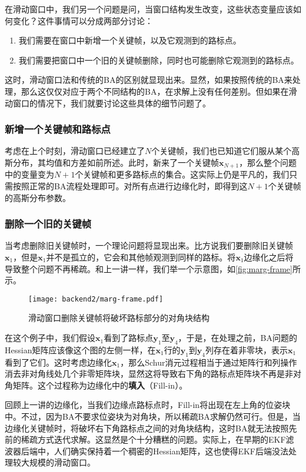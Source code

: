在滑动窗口中，我们另一个问题是问，当窗口结构发生改变，这些状态变量应该如何变化？这件事情可以分成两部分讨论：
\begin{enumerate}
\item 我们需要在窗口中新增一个关键帧，以及它观测到的路标点。
\item 我们需要把窗口中一个旧的关键帧删除，同时也可能删除它观测到的路标点。	
\end{enumerate}

这时，滑动窗口法和传统的BA的区别就显现出来。显然，如果按照传统的BA来处理，那么这仅仅对应于两个不同结构的BA，在求解上没有任何差别。但如果在滑动窗口的情况下，我们就要讨论这些具体的细节问题了。

\subsubsection{新增一个关键帧和路标点}
考虑在上个时刻，滑动窗口已经建立了$N$个关键帧，我们也已知道它们服从某个高斯分布，其均值和方差如前所述。此时，新来了一个关键帧$\bm{x}_{N+1}$，那么整个问题中的变量变为$N+1$个关键帧和更多路标点的集合。这实际上仍是平凡的，我们只需按照正常的BA流程处理即可。对所有点进行边缘化时，即得到这$N+1$个关键帧的高斯分布参数。

\subsubsection{删除一个旧的关键帧}
当考虑删除旧关键帧时，一个理论问题将显现出来。比方说我们要删除旧关键帧$\bm{x}_1$，但是$\bm{x}_1$并不是孤立的，它会和其他帧观测到同样的路标。将$\bm{x}_1$边缘化之后将导致整个问题不再稀疏。和上一讲一样，我们举一个示意图，如\autoref{fig:marg-frame}所示。

\begin{figure}[!ht]
    \centering
    \texttt{[image: backend2/marg-frame.pdf]}
    \caption{滑动窗口删除关键帧将破坏路标部分的对角块结构}
    \label{fig:marg-frame}
\end{figure}

在这个例子中，我们假设$\bm{x}_1$看到了路标点$\bm{y}_1$至$\bm{y}_4$，于是，在处理之前，BA问题的Hessian矩阵应该像这个图的左侧一样，在$\bm{x}_1$行的$\bm{y}_1$到$\bm{y}_4$列存在着非零块，表示$\bm{x}_1$看到了它们。这时考虑边缘化$\bm{x}_1$，那么Schur消元过程相当于通过矩阵行和列操作消去非对角线处几个非零矩阵块，显然这将导致右下角的路标点矩阵块不再是非对角矩阵。这个过程称为边缘化中的\textbf{填入}（Fill-in）\textsuperscript{\cite{Sibley2008}}。

回顾上一讲的边缘化，当我们边缘点路标点时，Fill-in将出现在左上角的位姿块中。不过，因为BA不要求位姿块为对角块，所以稀疏BA求解仍然可行。但是，当边缘化关键帧时，将破坏右下角路标点之间的对角块结构，这时BA就无法按照先前的稀疏方式迭代求解。这显然是个十分糟糕的问题。实际上，在早期的EKF滤波器后端中，人们确实保持着一个稠密的Hessian矩阵，这也使得EKF后端没法处理较大规模的滑动窗口。

